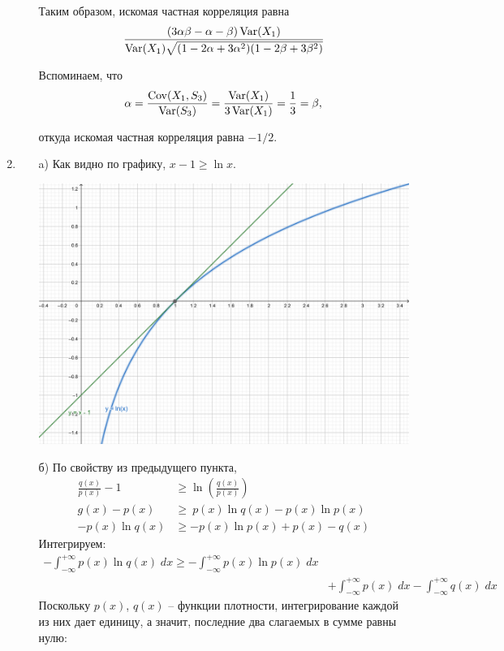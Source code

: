 \begin{enumerate}
\begin{enumerate}
Таким образом, искомая частная корреляция равна
\[
\frac{(3\alpha\beta-\alpha-\beta)\operatorname{Var}(X_1)}{\operatorname{Var}(X_1)\sqrt{(1-2\alpha+3\alpha^2)(1-2\beta+3\beta^2)}}
\]

Вспоминаем, что 
\[
\alpha=\frac{\operatorname{Cov}(X_1,S_3)}{\operatorname{Var}(S_3)}=\frac{\operatorname{Var}(X_1)}{3\operatorname{Var}(X_1)}=\frac{1}{3}=\beta,
\]

откуда искомая частная корреляция равна $-1/2$.
\end{enumerate}
\item 
\begin{enumerate}
\item[a)] Как видно по графику, $x-1\geq \ln x$.
\begin{minipage}{0.6\textwidth}
\begin{center}
\includegraphics[scale=0.5]{images/sol_kr_3_ip.png}
\end{center}
\end{minipage}
\item[б)] По свойству из предыдущего пункта, 
\begin{align*}
\frac{q(x)}{p(x)}-1&\geq\ln \left(\frac{q(x)}{p(x)}\right)\\
g(x)-p(x)&\geq\ p(x)\ln q(x)-p(x)\ln p(x)\\
-p(x)\ln q(x)&\geq -p(x)\ln p(x)+p(x)-q(x)
\end{align*}
Интегрируем:
\begin{align*}
-\int^{+\infty}_{-\infty}p(x)\ln q(x) \; dx \geq -\int^{+\infty}_{-\infty}p(x)\ln p(x) \; dx \\
&+\int^{+\infty}_{-\infty}p(x) \; dx - \int^{+\infty}_{-\infty}q(x) \; dx
\end{align*}
Поскольку $p(x)$, $q(x)$ – функции плотности, интегрирование каждой из них дает единицу, а значит, последние два слагаемых в сумме равны нулю:

\end{enumerate}
\end{enumerate}
